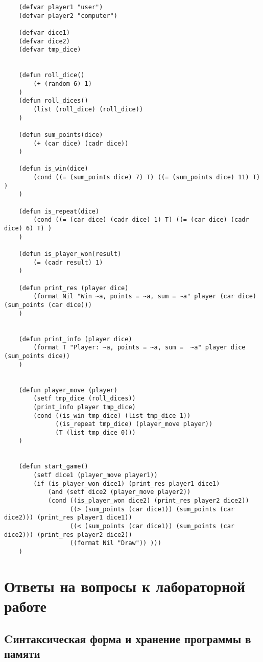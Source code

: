 \begin{lstlisting}
    (defvar player1 "user")
    (defvar player2 "computer")
    
    (defvar dice1)
    (defvar dice2)
    (defvar tmp_dice)
    
    
    (defun roll_dice() 
        (+ (random 6) 1)
    )
    (defun roll_dices() 
        (list (roll_dice) (roll_dice))
    )
    
    (defun sum_points(dice) 
        (+ (car dice) (cadr dice))
    )
    
    (defun is_win(dice) 
        (cond ((= (sum_points dice) 7) T) ((= (sum_points dice) 11) T) )
    )
    
    (defun is_repeat(dice)
        (cond ((= (car dice) (cadr dice) 1) T) ((= (car dice) (cadr dice) 6) T) )
    )
    
    (defun is_player_won(result) 
        (= (cadr result) 1)
    )
    
    (defun print_res (player dice) 
        (format Nil "Win ~a, points = ~a, sum = ~a" player (car dice) (sum_points (car dice)))
    )
    
    
    (defun print_info (player dice) 
        (format T "Player: ~a, points = ~a, sum =  ~a" player dice (sum_points dice))
    )
    
    
    (defun player_move (player)
        (setf tmp_dice (roll_dices))
        (print_info player tmp_dice)
        (cond ((is_win tmp_dice) (list tmp_dice 1))
              ((is_repeat tmp_dice) (player_move player))
              (T (list tmp_dice 0)))
    )
    
    
    (defun start_game()
        (setf dice1 (player_move player1))
        (if (is_player_won dice1) (print_res player1 dice1)
            (and (setf dice2 (player_move player2))
            (cond ((is_player_won dice2) (print_res player2 dice2))
                  ((> (sum_points (car dice1)) (sum_points (car dice2))) (print_res player1 dice1))
                  ((< (sum_points (car dice1)) (sum_points (car dice2))) (print_res player2 dice2)) 
                  ((format Nil "Draw")) )))
    )
\end{lstlisting}





\chapter{Ответы на вопросы к лабораторной работе}

\section{Cинтаксическая форма и хранение программы в памяти}


